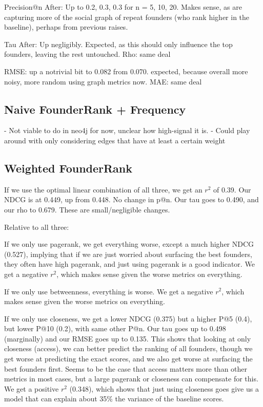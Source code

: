 Precision@n After: Up to 0.2, 0.3, 0.3 for n = 5, 10, 20. Makes sense, as are capturing more of the social graph of repeat founders (who rank higher in the baseline), perhaps from previous raises.

Tau After: Up negligibly. Expected, as this should only influence the top founders, leaving the rest untouched.
Rho: same deal

RMSE: up a notrivial bit to 0.082 from 0.070. expected, because overall more noisy, more random using graph metrics now.
MAE: same deal

\subsection{Naive FounderRank + Frequency}

- Not viable to do in neo4j for now, unclear how high-signal it is.
- Could play around with only considering edges that have at least a certain weight

\subsection{Weighted FounderRank}

If we use the optimal linear combination of all three, we get an $r^2$ of 0.39. Our NDCG is at 0.449, up from 0.448. No change in p@n. Our tau goes to 0.490, and our rho to 0.679. These are small/negligible changes.

Relative to all three:

If we only use pagerank, we get everything worse, except a much higher NDCG (0.527), implying that if we are just worried about surfacing the best founders, they often have high pagerank, and just using pagerank is a good indicator. We get a negative $r^2$, which makes sense given the worse metrics on everything.

If we only use betweenness, everything is worse. We get a negative $r^2$, which makes sense given the worse metrics on everything.

If we only use closeness, we get a lower NDCG (0.375) but a higher P@5 (0.4), but lower P@10 (0.2), with same other P@n. Our tau goes up to 0.498 (marginally) and our RMSE goes up to 0.135. This shows that looking at only closeness (access), we can better predict the ranking of all founders, though we get worse at predicting the exact scores, and we also get worse at surfacing the best founders first. Seems to be the case that access matters more than other metrics in most cases, but a large pagerank or closeness can compensate for this. We get a positive $r^2$ (0.348), which shows that just using closeness goes give us a model that can explain about 35\% the variance of the baseline scores.

